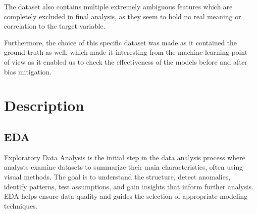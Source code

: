 \documentclass{article}
\begin{document}
The dataset also contains multiple extremely ambiguous features which are completely excluded in final analysis, as they seem to hold no real meaning or correlation to the target variable. 

Furthermore, the choice of this specific dataset was made as it contained the ground truth as well, which made it interesting from the machine learning point of view as it enabled us to check the effectiveness of the models before and after bias mitigation. 

\section{Description}

\subsection{EDA}
Exploratory Data Analysis is the initial step in the data analysis process where analysts examine datasets to summarize their main characteristics, often using visual methods. The goal is to understand the structure, detect anomalies, identify patterns, test assumptions, and gain insights that inform further analysis. EDA helps ensure data quality and guides the selection of appropriate modeling techniques.
\end{document}

